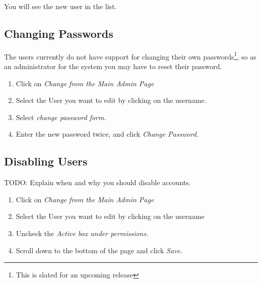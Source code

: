 You will see the new user in the list.

\subsection{Changing Passwords}

  The users currently do not have support for changing their own
passwords\footnote{This is slated for an upcoming release}, so as an
administrator for the system you may have to reset their password.

\begin{enumerate}
\item Click on \em{Change} from the Main Admin Page
\item Select the User you want to edit by clicking on the username.
\item Select \em{change password form}.
\item Enter the new password twice, and click \em{Change Password}.
\end{enumerate}

\subsection{Disabling Users}

  TODO: Explain when and why you should disable accounts.

\begin{enumerate}
\item Click on \em{Change} from the Main Admin Page
\item Select the User you want to edit by clicking on the username
\item Uncheck the \em{Active} box under permissions.
\item Scroll down to the bottom of the page and click \em{Save}.
\end{enumerate}

